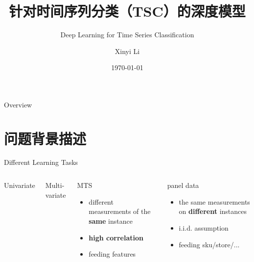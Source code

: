 \documentclass[aspectratio=169]{ctexbeamer}
\title{针对时间序列分类（TSC）的深度模型}
\subtitle{Deep Learning for Time Series Classification \footfullcite{fawaz2019deep}}
\author{Xinyi Li}
\date{\today}
\begin{document}
\begin{frame}
	\titlepage
\end{frame}

\begin{frame}{Overview}
  \tableofcontents
\end{frame}

\section{问题背景描述}
\begin{frame}{Different Learning Tasks}
	\begin{columns}

		Univariate

		Multi-variate
		\begin{block}{MTS}
			\begin{itemize}
				\item different measurements of the \textbf{same} instance
				\item \textbf{high correlation}
				\item feeding features
			\end{itemize}
		\end{block}

		\begin{block}{panel data}
			\begin{itemize}
				\item the same measurements on \textbf{different} instances
				\item i.i.d. assumption
				\item feeding sku/store/...
			\end{itemize}
		\end{block}
	\end{columns}
\end{frame}
\end{document}
